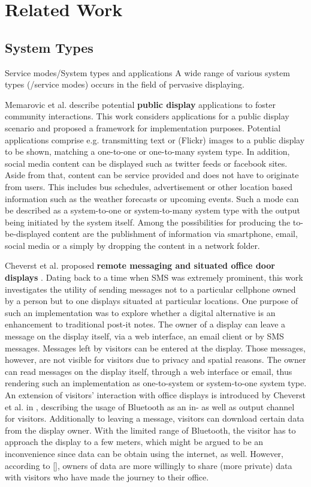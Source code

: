 \section{Related Work}

\subsection{System Types}
Service modes/System types and applications
A wide range of various system types (/service modes) occurs in the field of pervasive displaying.

Memarovic et al. \cite{memarovic_places} describe potential \textbf{public display} applications to foster community interactions.
This work considers applications for a public display scenario and proposed a framework for implementation purposes.
Potential applications comprise e.g. transmitting text or (Flickr) images to a public display to be shown, matching a one-to-one or one-to-many system type.
In addition, social media content can be displayed such as twitter feeds or facebook sites.
Aside from that, content can be service provided and does not have to originate from users.
This includes bus schedules, advertisement or other location based information such as the weather forecasts or upcoming events.
Such a mode can be described as a system-to-one or system-to-many system type with the output being initiated by the system itself.
Among the possibilities for producing the to-be-displayed content are the publishment of information via smartphone, email, social media or a simply by dropping the content in a network folder.

Cheverst et al. proposed \textbf{remote messaging and situated office door displays} \cite{cheverst2003exploring}.
Dating back to a time when SMS was extremely prominent, this work investigates the utility of sending messages not to a particular cellphone owned by a person but to one displays situated at particular locations.
One purpose of such an implementation was to explore whether a digital alternative is an enhancement to traditional post-it notes.
The owner of a display can leave a message on the display itself, via a web interface, an email client or by SMS messages.
Messages left by visitors can be entered at the display.
Those messages, however, are not visible for visitors due to privacy and spatial reasons.
The owner can read messages on the display itself, through a web interface or email, thus rendering such an implementation as one-to-system or system-to-one system type.
An extension of visitors’ interaction with office displays is introduced by Cheverst et al. in \cite{cheverst2005exploring}, describing the usage of Bluetooth as an in- as well as output channel for visitors.
Additionally to leaving a message, visitors can download certain data from the display owner.
With the limited range of Bluetooth, the visitor has to approach the display to a few meters, which might be argued to be an inconvenience since data can be obtain using the internet, as well.
However, according to [], owners of data are more willingly to share (more private) data with visitors who have made the journey to their office.

